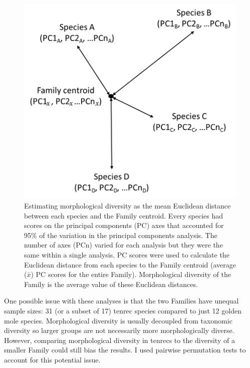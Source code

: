 	\begin{figure}[!htbp]
	\centering
	\includegraphics [width=0.7\linewidth, height=0.7\textheight, keepaspectratio]{Disparity/writing/figures/Centroids.png}
	\caption[Calculating diversity as mean Euclidean distance to Family centroid.]
		{Estimating morphological diversity as the mean Euclidean distance between each species and the Family centroid. Every species had scores on the principal components (PC) axes that accounted for 95\% of the variation in the principal components analysis. The number of axes (PCn) varied for each analysis but they were the same within a single analysis. PC scores were used to calculate the Euclidean distance from each species to the Family centroid (average (\begin{math}
			\bar{x}
			\end{math}) PC scores for the entire Family). Morphological diversity of the Family is the average value of these Euclidean distances.}
	\label{fig:centroids}
	\end{figure}


	
	One possible issue with these analyses is that the two Families have unequal sample sizes: 31 (or a subset of 17) tenrec species compared to just 12 golden mole species. Morphological diversity is usually decoupled from taxonomic diversity \citep[e.g.][]{Ruta2013, Hopkins2013} so larger groups are not necessarily more morphologically diverse. However, comparing morphological diversity in tenrecs to the diversity of a smaller Family could still bias the results. I used pairwise permutation tests to account for this potential issue. 

